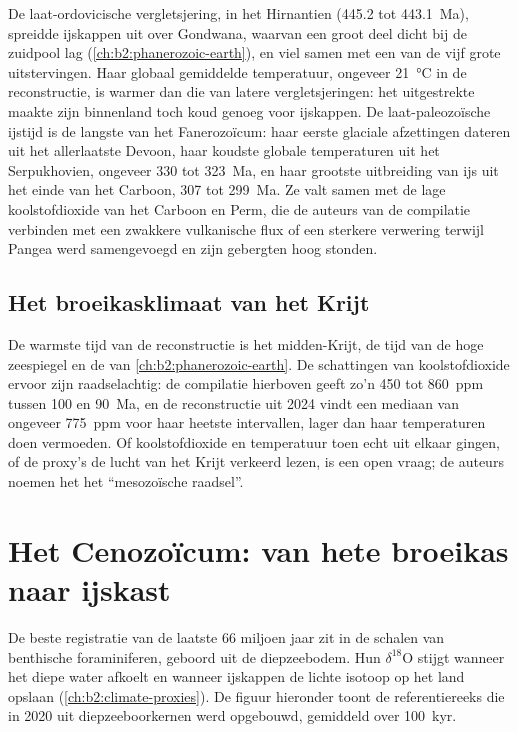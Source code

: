 De laat-ordovicische vergletsjering, in het Hirnantien (445.2 tot \qty{443.1}{Ma}), spreidde ijskappen
uit over Gondwana, waarvan een groot deel dicht bij de zuidpool lag (\cref{ch:b2:phanerozoic-earth}), en
viel samen met een van de vijf grote uitstervingen. Haar globaal gemiddelde temperatuur, ongeveer
\qty{21}{\celsius} in de reconstructie, is warmer dan die van latere vergletsjeringen: het uitgestrekte
 maakte zijn binnenland toch koud genoeg voor ijskappen. De laat-paleozoïsche ijstijd is
de langste van het Fanerozoïcum: haar eerste glaciale afzettingen dateren uit het allerlaatste Devoon, haar koudste globale
temperaturen uit het Serpukhovien, ongeveer 330 tot \qty{323}{Ma}, en haar grootste uitbreiding
van ijs uit het einde van het Carboon, 307 tot \qty{299}{Ma}. Ze valt samen met de lage
koolstofdioxide van het Carboon en Perm, die de auteurs van de compilatie verbinden met een zwakkere vulkanische
flux of een sterkere verwering terwijl Pangea werd samengevoegd en zijn gebergten hoog stonden.

\subsection*{Het broeikasklimaat van het Krijt}

De warmste tijd van de reconstructie is het midden-Krijt, de tijd van de hoge zeespiegel en de
 van \cref{ch:b2:phanerozoic-earth}. De schattingen van koolstofdioxide ervoor
zijn raadselachtig: de compilatie hierboven geeft zo'n 450 tot \qty{860}{ppm} tussen 100 en
\qty{90}{Ma}, en de reconstructie uit 2024 vindt een mediaan van ongeveer \qty{775}{ppm} voor haar heetste
intervallen, lager dan haar temperaturen doen vermoeden. Of koolstofdioxide en temperatuur toen echt uit elkaar
gingen, of de proxy's de lucht van het Krijt verkeerd lezen, is een open vraag; de auteurs noemen het het ``mesozoïsche
raadsel''.

\section{Het Cenozoïcum: van hete broeikas naar ijskast}\label{sec:b2:deep-time-climate:cenozoic}

De beste registratie van de laatste 66 miljoen jaar zit in de schalen van benthische foraminiferen, geboord uit
de diepzeebodem. Hun $\delta^{18}$O stijgt wanneer het diepe water afkoelt en wanneer ijskappen de
lichte isotoop op het land opslaan (\cref{ch:b2:climate-proxies}). De figuur hieronder toont de
referentiereeks die in 2020 uit diepzeeboorkernen werd opgebouwd, gemiddeld over \qty{100}{kyr}.


